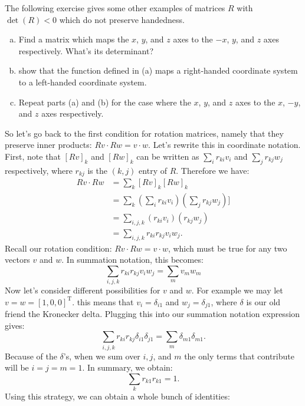 The following exercise gives some other examples of matrices $R$ with $\det(R)< 0$ which do not preserve handedness.

\begin{exercise}{}
\begin{enumerate}[(a)]
\item
Find a matrix which  maps the $x$, $y$, and $z$ axes to the $-x$, $y$, and $z$ axes respectively.  What's its determinant?
\item  show that the function defined in (a) maps a right-handed coordinate system to a left-handed coordinate system.
\item Repeat parts (a) and (b) for the case where the $x$, $y$, and $z$ axes to the $x$, $-y$, and $z$ axes respectively.
\end{enumerate}
\end{exercise}

So let's go back to the first condition for rotation matrices, namely that they preserve inner products: $Rv \cdot Rw = v \cdot w$. Let's rewrite this in coordinate notation. First, note that $[Rv]_k$  and $[Rw]_k$ can be written as $\sum_i r_{ki}v_i$ and $\sum_j r_{kj} w_j$ respectively, where $r_{kj}$ is  the $(k,j)$ entry of $R$. Therefore we have:
\begin{align*}
 Rv \cdot Rw &= \sum_k  [Rv]_k[Rw]_k \\
&= \sum_k \left(\sum_i r_{ki}v_i \right)\left(\sum_j r_{kj}w_j \right)] \\
&= \sum_{i,j,k} (r_{ki}v_i)(r_{kj}w_j) \\
&= \sum_{i,j,k} r_{ki}r_{kj} v_i w_j. 
\end{align*}
Recall our rotation condition:  $ Rv \cdot Rw = v\cdot w$, which must be true for any two vectors $v$ and $w$. In summation notation, this becomes:
\[\sum_{i,j,k} r_{ki}r_{kj} v_i w_j =  \sum_m  v_m w_m \]
Now let's consider different possibilities for $v$ and $w$. For example we may let $ v=w=[1,0,0]^{\text{T}}$. this means that $v_i = \delta_{i1}$ and $w_j = \delta_{j1}$, where $\delta$ is our old friend the Kronecker delta.  Plugging this into our summation notation expression gives:
\[\sum_{i,j,k} r_{ki}r_{kj} \delta_{i1}\delta_{j1} =  \sum_m  \delta_{m1}\delta_{m1}. \]
Because of the $\delta$'s, when we sum over $i,j$, and $m$ the only terms that contribute will be $i=j=m=1$.  In summary, we obtain:
\[\sum_{k} r_{k1}r_{k1}  = 1. \]
Using this strategy, we can obtain a whole bunch of identities:

